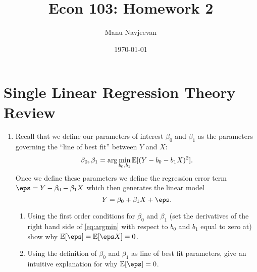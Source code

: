 \documentclass[10pt]{article}
\title{Econ 103: Homework 2} %
\author{Manu Navjeevan}
\date{\today}
\begin{document}
\maketitle

\section*{Single Linear Regression Theory Review}%

\begin{enumerate}
	\item Recall that we define our parameters of interest \(\beta_0\) and  \(\beta_1\) as the parameters governing the  ``line of best fit'' between \(Y\) and  \(X\):
	 \begin{equation}
		 \label{eq:argmin}
		 \beta_0,\beta_1 = \arg\min_{b_0,b_1} \mathbb{E}[(Y - b_0 - b_1X)^2]
	.\end{equation} 
	Once we define these parameters we define the regression error term \(\eps = Y - \beta_0 - \beta_1X\) which then generates the linear model
	 \[
	    Y = \beta_0 + \beta_1X + \eps
	.\] 
	\begin{enumerate}
		\item Using the first order conditions for \(\beta_0\) and  \(\beta_1\) (set the derivatives of the right hand side of \eqref{eq:argmin} with respect to \(b_0\) and  \(b_1\) equal to zero at) show why \(\E[\eps] = \E[\eps X]=0\).
		\item Using the definition of \(\beta_0\) and  \(\beta_1\) as line of best fit parameters, give an intuitive explanation for why  \(\E[\eps] = 0\).
	\end{enumerate}

\end{enumerate}
\end{document}
